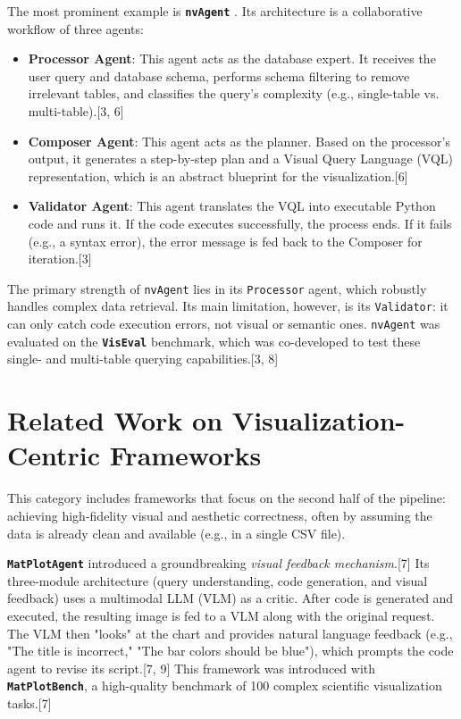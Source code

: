 \documentclass[a4paper,oneside,bibliography=totoc]{scrbook}
\begin{document}
The most prominent example is \textbf{\texttt{nvAgent}} \cite{ouyang2025nvagent}. Its architecture is a collaborative workflow of three agents:
\begin{itemize}
 \item \textbf{Processor Agent}: This agent acts as the database expert. It receives the user query and database schema, performs schema filtering to remove irrelevant tables, and classifies the query's complexity (e.g., single-table vs. multi-table).[3, 6]
 \item \textbf{Composer Agent}: This agent acts as the planner. Based on the processor's output, it generates a step-by-step plan and a Visual Query Language (VQL) representation, which is an abstract blueprint for the visualization.[6]
 \item \textbf{Validator Agent}: This agent translates the VQL into executable Python code and runs it. If the code executes successfully, the process ends. If it fails (e.g., a syntax error), the error message is fed back to the Composer for iteration.[3]
\end{itemize}
The primary strength of \texttt{nvAgent} lies in its \texttt{Processor} agent, which robustly handles complex data retrieval. Its main limitation, however, is its \texttt{Validator}: it can only catch code execution errors, not visual or semantic ones. \texttt{nvAgent} was evaluated on the \textbf{\texttt{VisEval}} benchmark, which was co-developed to test these single- and multi-table querying capabilities.[3, 8]

\section{Related Work on Visualization-Centric Frameworks}

This category includes frameworks that focus on the second half of the pipeline: achieving high-fidelity visual and aesthetic correctness, often by assuming the data is already clean and available (e.g., in a single CSV file).

\textbf{\texttt{MatPlotAgent}} \cite{yang2024matplotagent} introduced a groundbreaking \emph{visual feedback mechanism}.[7] Its three-module architecture (query understanding, code generation, and visual feedback) uses a multimodal LLM (VLM) as a critic. After code is generated and executed, the resulting image is fed to a VLM along with the original request. The VLM then "looks" at the chart and provides natural language feedback (e.g., "The title is incorrect," "The bar colors should be blue"), which prompts the code agent to revise its script.[7, 9] This framework was introduced with \textbf{\texttt{MatPlotBench}}, a high-quality benchmark of 100 complex scientific visualization tasks.[7]
\end{document}
